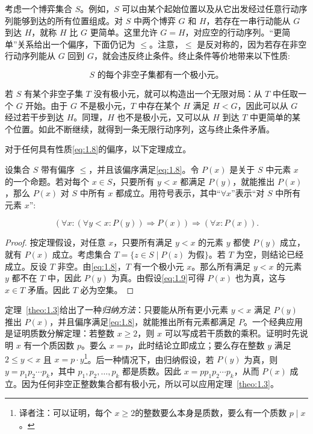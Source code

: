 考虑一个博弈集合 \(S\)。例如，\(S\) 可以由某个起始位置以及从它出发经过任意行动序列能够到达的所有位置组成。对 \(S\) 中两个博弈 \(G\) 和 \(H\)，若存在一串行动能从 \(G\) 到达 \(H\)，就称 \(H\) 比 \(G\) 更简单。这里允许 \(G=H\)，对应空的行动序列。“更简单”关系给出一个偏序，下面仍记为 \(\leq\)。注意，\(\leq\) 是反对称的，因为若存在非空行动序列能从 \(G\) 回到 \(G\)，就会违反终止条件。终止条件等价地带来以下性质:

\begin{equation}
\text{$S$ 的每个非空子集都有一个极小元。}\label{eq:1.8}
\end{equation}

若 \(S\) 有某个非空子集 \(T\) 没有极小元，就可以构造出一个无限对局：从 \(T\) 中任取一个 \(G\) 开始。由于 \(G\) 不是极小元，\(T\) 中存在某个 \(H\) 满足 \(H<G\)，因此可以从 \(G\) 经过若干步到达 \(H\)。同理，\(H\) 也不是极小元，又可以从 \(H\) 到达 \(T\) 中更简单的某个位置。如此不断继续，就得到一条无限行动序列，这与终止条件矛盾。
 
对于任何具有性质\eqref{eq:1.8}的偏序，以下定理成立。

\begin{theorem}\label{theo:1.3}设集合 \(S\) 带有偏序 \(\leq\)，并且该偏序满足\eqref{eq:1.8}。令 \(P(x)\) 是关于 \(S\) 中元素 \(x\) 的一个命题。若对每个 \(x\in S\)，只要所有 \(y<x\) 都满足 \(P(y)\)，就能推出 \(P(x)\)，那么 \(P(x)\) 对 \(S\) 中所有 \(x\) 都成立。用符号表示，其中“\(\forall x\)”表示“对 \(S\) 中所有元素 \(x\)”:

\begin{equation}
\left( {\forall x : \left( {\forall y < x : P\left( y\right) }\right)  \Rightarrow  P\left( x\right) }\right)  \Rightarrow  \left( {\forall x : P\left( x\right) }\right).  \label{eq:1.9}
\end{equation}
\end{theorem}

\begin{proof}
按定理假设，对任意 \(x\)，只要所有满足 \(y<x\) 的元素 \(y\) 都使 \(P(y)\) 成立，就有 \(P(x)\) 成立。考虑集合 \(T=\{z\in S\mid P(z)\text{ 为假}\}\)。若 \(T\) 为空，则结论已经成立。反设 \(T\) 非空。由\eqref{eq:1.8}，\(T\) 有一个极小元 \(x\)。那么所有满足 \(y<x\) 的元素 \(y\) 都不在 \(T\) 中，因此 \(P(y)\) 为真。由假设\eqref{eq:1.9}可得 \(P(x)\) 也为真，这与 \(x\in T\) 矛盾。因此 \(T\) 必为空集。
\end{proof}


定理~\ref{theo:1.3}给出了一种\textit{归纳方法}：只要能从所有更小元素 \(y<x\) 满足 \(P(y)\) 推出 \(P(x)\)，并且偏序满足\eqref{eq:1.8}，就能推出所有元素都满足 \(P\)。一个经典应用是证明质数分解定理：若整数 \(x\geq 2\)，则 \(x\) 可以写成若干质数的乘积。证明时先说明 \(x\) 有一个质因数 \(p\)。要么 \(x=p\)，此时结论立即成立；要么存在整数 \(y\) 满足 \(2\leq y<x\) 且 \(x=p\cdot y\)\footnote{译者注：可以证明，每个 $x\ge2$的整数要么本身是质数，要么有一个质数 $p\mid x$。}。后一种情况下，由归纳假设，若 \(P(y)\) 为真，则 \(y=p_{1}p_{2}\cdots p_{k}\)，其中 \(p_{1},p_{2},\ldots,p_{k}\) 都是质数。因此 \(x=pp_{1}p_{2}\cdots p_{k}\)，从而 \(P(x)\) 成立。因为任何非空正整数集合都有极小元，所以可以应用定理~\ref{theo:1.3}。

